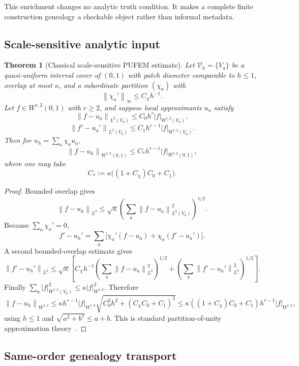 \documentclass[11pt]{article}
\newtheorem{theorem}{Theorem}[section]
\theoremstyle{definition}
\newcommand{\norm}[1]{\left\lVert #1 \right\rVert}
\begin{document}
This enrichment changes no analytic truth condition.  It makes a complete finite
construction genealogy a checkable object rather than informal metadata.

\subsection{Scale-sensitive analytic input}

\begin{theorem}[Classical scale-sensitive PUFEM estimate]\label{thm:scalePUFEM}
Let $\mathcal V_h=\{V_a\}$ be a quasi-uniform interval cover of $(0,1)$ with patch diameter
comparable to $h\le1$, overlap at most $\kappa$, and a subordinate partition $(\chi_a)$
with
\[
 \norm{\chi_a'}_\infty\le C_\chi h^{-1}.
\]
Let $f\in W^{r,2}(0,1)$ with $r\ge2$, and suppose local approximants $u_a$ satisfy
\[
 \norm{f-u_a}_{L^2(V_a)}
 \le C_0h^r|f|_{W^{r,2}(V_a)},
\]
\[
 \norm{f'-u_a'}_{L^2(V_a)}
 \le C_1h^{r-1}|f|_{W^{r,2}(V_a)}.
\]
Then for $u_h=\sum_a\chi_au_a$,
\[
 \norm{f-u_h}_{W^{1,2}(0,1)}
 \le C_*h^{r-1}|f|_{W^{r,2}(0,1)},
\]
where one may take
\[
 C_*:=\kappa\bigl((1+C_\chi)C_0+C_1\bigr).
\]
\end{theorem}

\begin{proof}
Bounded overlap gives
\[
 \norm{f-u_h}_{L^2}
 \le\sqrt\kappa\left(\sum_a\norm{f-u_a}_{L^2(V_a)}^2\right)^{1/2}.
\]
Because $\sum_a\chi_a'=0$,
\[
 f'-u_h'=\sum_a\bigl[\chi_a'(f-u_a)+\chi_a(f'-u_a')\bigr].
\]
A second bounded-overlap estimate gives
\[
 \norm{f'-u_h'}_{L^2}
 \le\sqrt\kappa\left[
 C_\chi h^{-1}\left(\sum_a\norm{f-u_a}_{L^2}^2\right)^{1/2}
 +\left(\sum_a\norm{f'-u_a'}_{L^2}^2\right)^{1/2}
 \right].
\]
Finally $\sum_a|f|_{W^{r,2}(V_a)}^2\le\kappa|f|_{W^{r,2}}^2$.  Therefore
\[
 \norm{f-u_h}_{W^{1,2}}
 \le \kappa h^{r-1}|f|_{W^{r,2}}
 \sqrt{C_0^2h^2+(C_\chi C_0+C_1)^2}
 \le \kappa((1+C_\chi)C_0+C_1)h^{r-1}|f|_{W^{r,2}},
\]
using $h\le1$ and $\sqrt{a^2+b^2}\le a+b$.  This is standard partition-of-unity
approximation theory~\cite{MelenkBabuska96,BabuskaMelenk}.
\end{proof}

\subsection{Same-order genealogy transport}
\end{document}
